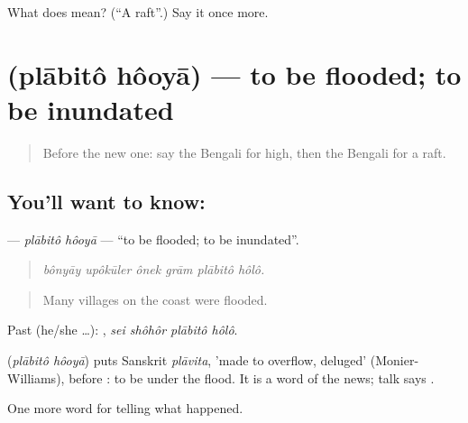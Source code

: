 \begin{tcolorbox}[breakable,colback=teal!4,colframe=teal!35!black,title={Before you move on}]
What does  mean? (\textquotedblleft{}A raft\textquotedblright{}.) Say it once more.
\end{tcolorbox}
\section[\texorpdfstring{\bn{প্লাবিত} \bn{হওয়া} (plābitô hôoyā)}{প্লাবিত হওয়া (plābitô hôoyā)}]{  (plābitô hôoyā) — to be flooded; to be inundated}

\label{lesson:BN-C289-plabito-hooya}



\begin{quote}
Before the new one: say the Bengali for high, then the Bengali for a raft.
\end{quote}

\subsection*{You'll want to know:  }
\textbf{ } — \emph{plābitô hôoyā} — \textquotedblleft{}to be flooded; to be inundated\textquotedblright{}.

\begin{quote}
     
\end{quote}

\begin{quote}
\emph{bônyāy upôkūler ônek grām plābitô hôlô.}
\end{quote}

\begin{quote}
Many villages on the coast were flooded.
\end{quote}

Past (he/she …):    , \emph{sei shôhôr plābitô hôlô}.

\begin{cousinweb}
\textbf{ } (\emph{plābitô hôoyā}) puts Sanskrit \emph{plāvita}, 'made to overflow, deluged' (Monier-Williams), before \textbf{}: to be under the flood. It is a word of the news; talk says   .
\end{cousinweb}

\begin{grammarlens}[title={What you've built}]
One more word for telling what happened.
\end{grammarlens}

